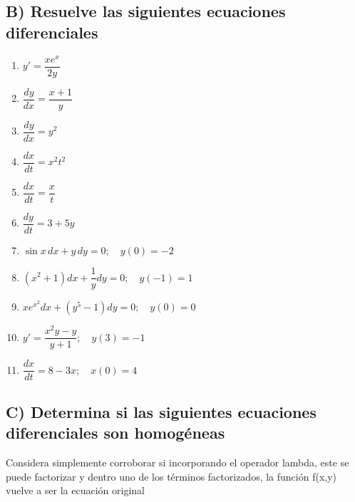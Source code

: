 \documentclass[a4paper,12pt]{article}
\begin{document}
\subsection*{B) Resuelve las siguientes ecuaciones diferenciales}
\begin{multicols}{2}
\begin{enumerate}
  \item $y' = \dfrac{x e^x}{2y}$
  \item $\dfrac{dy}{dx} = \dfrac{x+1}{y}$
  \item $\dfrac{dy}{dx} = y^2$
  \item $\dfrac{dx}{dt} = x^2 t^2$
  \item $\dfrac{dx}{dt} = \dfrac{x}{t}$
  \item $\dfrac{dy}{dt} = 3 + 5y$
  \item $\sin x \, dx + y \, dy = 0; \quad y(0)=-2$
  \item $(x^2+1)dx + \dfrac{1}{y}dy=0; \quad y(-1)=1$
  \item $x e^{x^2} dx + (y^5-1)dy=0; \quad y(0)=0$
  \item $y' = \dfrac{x^2 y - y}{y+1}; \quad y(3)=-1$
  \item $\dfrac{dx}{dt} = 8-3x; \quad x(0)=4$
\end{enumerate}
\end{multicols}
\subsection*{C) Determina si las siguientes ecuaciones diferenciales son homogéneas}
Considera simplemente corroborar si incorporando el operador lambda, este se puede factorizar y dentro uno de los términos factorizados, la función f(x,y) vuelve a ser la ecuación original
\end{document}
